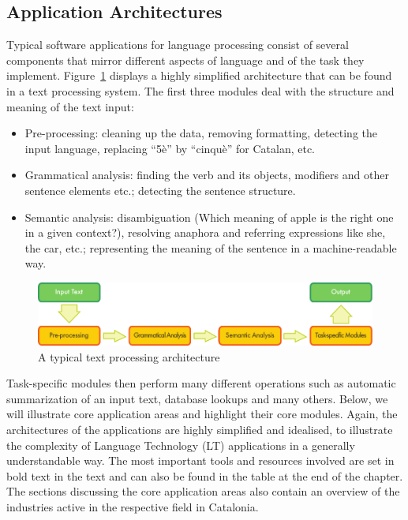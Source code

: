 \begin{multicols}{2}
\subsection{Application Architectures}

Typical software applications for language processing consist of several components that mirror different aspects of language and of the task they implement. Figure~\ref{fig:textprocessingarch_en} displays a highly simplified architecture that can be found in a text processing system. The first three modules deal with the structure and meaning of the text input:
\begin{itemize}
\item Pre-processing: cleaning up the data, removing formatting, detecting the input language, replacing “5è” by “cinquè” for Catalan, etc.
\item Grammatical analysis: finding the verb and its objects, modifiers and other sentence elements etc.; detecting the sentence structure.
\item Semantic analysis: disambiguation (Which meaning of apple is the right one in a given context?), resolving anaphora and referring expressions like she, the car, etc.; representing the meaning of the sentence in a machine-readable way.
\end{itemize}

\begin{figure}[b]
  \center
  \includegraphics[width=\textwidth]{../_media/english/text_processing_app_architecture}
  \caption{A typical text processing architecture}
  \label{fig:textprocessingarch_en}
\end{figure}

Task-specific modules then perform many different operations such as automatic summarization of an input text, database lookups and many others. Below, we will illustrate core application areas and highlight their core modules. Again, the architectures of the applications are highly simplified and idealised, to illustrate the complexity of Language Technology (LT) applications in a generally understandable way. The most important tools and resources involved are set in bold text in the text and can also be found in the table at the end of the chapter.  The sections discussing the core application areas also contain an overview of the industries active in the respective field in Catalonia. 


\end{multicols}
